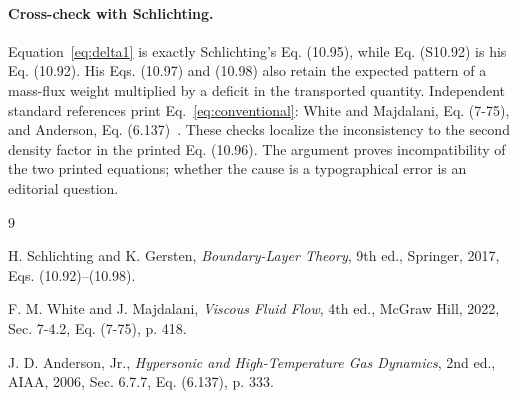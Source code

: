 \documentclass[11pt,a4paper]{article}
\begin{document}
\paragraph{Cross-check with Schlichting.}
Equation~\eqref{eq:delta1} is exactly Schlichting's Eq. (10.95), while
Eq. (S10.92) is his Eq. (10.92). His Eqs. (10.97) and (10.98) also retain the
expected pattern of a mass-flux weight multiplied by a deficit in the
transported quantity. Independent standard references print
Eq.~\eqref{eq:conventional}: White and Majdalani, Eq. (7-75), and Anderson,
Eq. (6.137)~\cite{White2022,Anderson2006}. These checks localize the
inconsistency to the second density factor in the printed Eq. (10.96). The
argument proves incompatibility of the two printed equations; whether the
cause is a typographical error is an editorial question.

\begin{thebibliography}{9}
\small

H. Schlichting and K. Gersten,
\emph{Boundary-Layer Theory}, 9th ed., Springer, 2017,
Eqs. (10.92)--(10.98).

F. M. White and J. Majdalani,
\emph{Viscous Fluid Flow}, 4th ed., McGraw Hill, 2022,
Sec. 7-4.2, Eq. (7-75), p. 418.

J. D. Anderson, Jr.,
\emph{Hypersonic and High-Temperature Gas Dynamics}, 2nd ed., AIAA, 2006,
Sec. 6.7.7, Eq. (6.137), p. 333.

\end{thebibliography}
\end{document}
